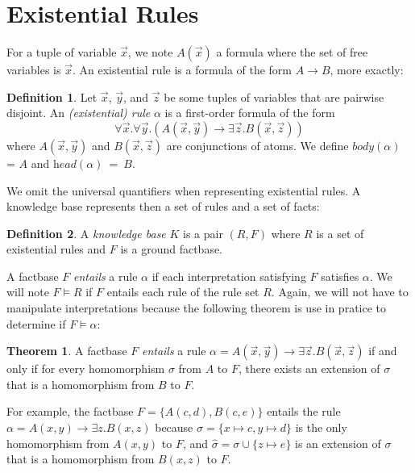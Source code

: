 \documentclass{article}
\theoremstyle{definition}
\newtheorem{definition}{Definition}[section]
\newtheorem{theorem}{Theorem}[section]
\theoremstyle{remark}
\begin{document}
\section{Existential Rules}

For a tuple of variable $\vec x$, we note $A(\vec x)$ a formula where the set of free variables is $\vec x$. An existential rule is a formula of the form $A \rightarrow B$, more exactly:

\begin{definition}
Let $\vec x$, $\vec y$, and $\vec z$ be some tuples of variables that are pairwise disjoint. An \emph{(existential) rule} $\alpha$ is a first-order formula	of the form $$\forall \vec x.\forall \vec y.( A(\vec x,\vec y) \rightarrow \exists \vec z. B(\vec x,\vec z))$$ where $A(\vec x,\vec y)$ and $B(\vec x,\vec z)$ are conjunctions of atoms. We define \emph{$\textit{body}(\alpha)$} = $A$ and \emph{$\textit{head}(\alpha)$}~=~$B$.
\end{definition}
We omit the universal quantifiers when representing existential rules. A knowledge base represents then a set of rules and a set of facts:

\begin{definition}
A \emph{knowledge base} $K$ is a pair $(R,F)$ where $R$ is a set of existential rules and $F$ is a  ground factbase.
\end{definition}



A factbase $F$ \emph{entails} a rule $\alpha$ if each interpretation satisfying $F$ satisfies $\alpha$. We will note $F \vDash R$ if $F$ entails each rule of the rule set $R$. Again, we will not have to manipulate interpretations because the following theorem is use in pratice to determine if $F \vDash \alpha$:

\begin{theorem}
A factbase $F$ \emph{entails} a rule $\alpha = A(\vec x,\vec y) \rightarrow \exists \vec z. B(\vec x,\vec z)$ if and only if for every homomorphism $\sigma$ from $A$ to $F$, there exists an extension of $\sigma$ that is a homomorphism from $B$ to $F$.
\end{theorem}

For example, the factbase $F=\{A(c,d),B(c,e)\}$ entails the rule $\alpha = A(x,y) \rightarrow \exists z. B(x,z)$ because $\sigma = \{x \mapsto c,y \mapsto d\}$ is the only homomorphism from $A(x,y)$ to $F$, and $\hat \sigma = \sigma \cup \{z \mapsto e\}$ is an extension of $\sigma$ that is a homomorphism from $B(x,z)$ to $F$. 
\end{document}
